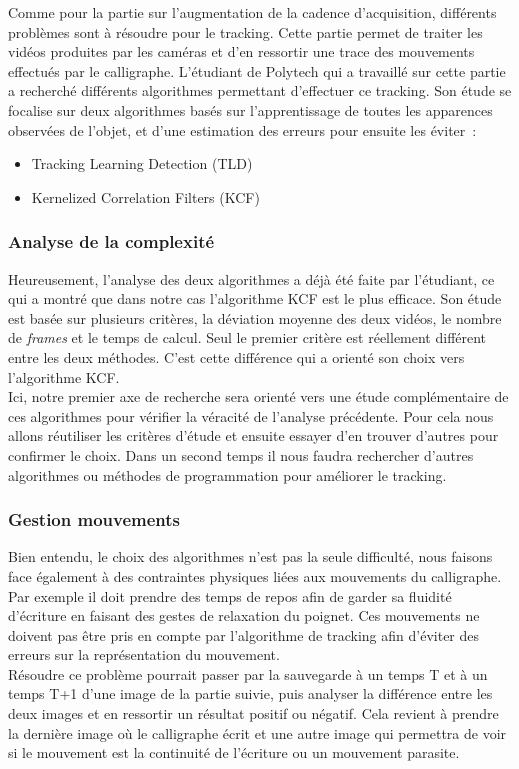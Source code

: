Comme pour la partie sur l'augmentation de la cadence d'acquisition, différents problèmes sont à résoudre pour le tracking. Cette partie permet de traiter les vidéos produites par les caméras et d'en ressortir une trace des mouvements effectués par le calligraphe. L'étudiant de Polytech qui a travaillé sur cette partie a recherché différents algorithmes permettant d'effectuer ce tracking. Son étude se focalise sur deux algorithmes basés sur l'apprentissage de toutes les apparences observées de l'objet, et d'une estimation des erreurs pour ensuite les éviter~:

\begin{itemize}

\item Tracking Learning Detection (TLD)

\item Kernelized Correlation Filters (KCF)

\end{itemize}

  
\subsubsection{Analyse de la complexité}

Heureusement, l'analyse des deux algorithmes a déjà été faite par l'étudiant, ce qui a montré que dans notre cas l'algorithme KCF est le plus efficace. Son étude est basée sur plusieurs critères, la déviation moyenne des deux vidéos, le nombre de \textit{frames} et le temps de calcul. Seul le premier critère est réellement différent entre les deux méthodes. C'est cette différence qui a orienté son choix vers l'algorithme KCF. \\

Ici, notre premier axe de recherche sera orienté vers une étude complémentaire de ces algorithmes pour vérifier la véracité de l'analyse précédente. Pour cela nous allons réutiliser les critères d'étude et ensuite essayer d'en trouver d'autres pour confirmer le choix. Dans un second temps il nous faudra rechercher d'autres algorithmes ou méthodes de programmation pour améliorer le tracking.

\subsubsection{Gestion mouvements}

Bien entendu, le choix des algorithmes n'est pas la seule difficulté, nous faisons face également à des contraintes physiques liées aux mouvements du calligraphe. Par exemple il doit prendre des temps de repos afin de garder sa fluidité d'écriture en faisant des gestes de relaxation du poignet. Ces mouvements ne doivent pas être pris en compte par l'algorithme de tracking afin d'éviter des erreurs sur la représentation du mouvement. \\

Résoudre ce problème pourrait passer par la sauvegarde à un temps T et à un temps T+1 d'une image de la partie suivie, puis analyser la différence entre les deux images et en ressortir un résultat positif ou négatif. Cela revient à prendre la dernière image où le calligraphe écrit et une autre image qui permettra de voir si le mouvement est la continuité de l'écriture ou un mouvement parasite.